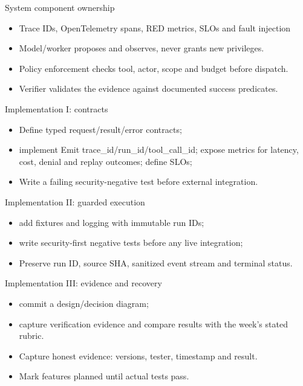 \documentclass[aspectratio=169,10pt]{beamer}
\begin{document}
\begin{frame}{System component ownership}
\small
\begin{itemize}
\item Trace IDs, OpenTelemetry spans, RED metrics, SLOs and fault injection
\item Model/worker proposes and observes, never grants new privileges.
\item Policy enforcement checks tool, actor, scope and budget before dispatch.
\item Verifier validates the evidence against documented success predicates.
\end{itemize}

\end{frame}

\begin{frame}{Implementation I: contracts}
\small
\begin{itemize}
\item Define typed request/result/error contracts;
\item implement Emit trace\_id/run\_id/tool\_call\_id; expose metrics for latency, cost, denial and replay outcomes; define SLOs;
\item Write a failing security-negative test before external integration.
\end{itemize}

\end{frame}

\begin{frame}{Implementation II: guarded execution}
\small
\begin{itemize}
\item add fixtures and logging with immutable run IDs;
\item write security-first negative tests before any live integration;
\item Preserve run ID, source SHA, sanitized event stream and terminal status.
\end{itemize}

\end{frame}

\begin{frame}{Implementation III: evidence and recovery}
\small
\begin{itemize}
\item commit a design/decision diagram;
\item capture verification evidence and compare results with the week's stated rubric.
\item Capture honest evidence: versions, tester, timestamp and result.
\item Mark features planned until actual tests pass.
\end{itemize}

\end{frame}
\end{document}
